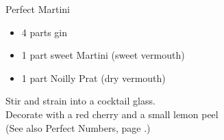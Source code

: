 \begin{algorithm}{Perfect Martini}
\desc
\begin{itemize}
\item 4 parts gin
\item 1 part sweet Martini (sweet vermouth)
\item 1 part Noilly Prat (dry vermouth)
\end{itemize}
Stir and strain into a cocktail glass.\\
Decorate with a red cherry and a small lemon peel\\
(See also Perfect Numbers, page \pageref{perfnum}.)
\end{algorithm}
